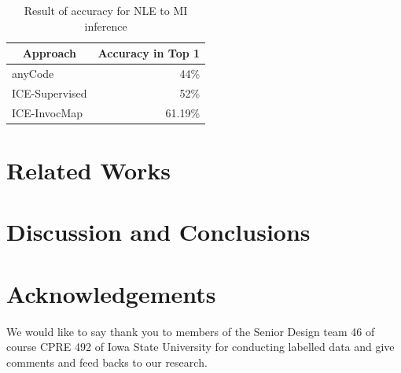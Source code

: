 \documentclass[sigconf,review]{acmart}
\begin{document}
\begin{table}[H]
\small
\caption{Result of accuracy for NLE to MI inference}
\label{tblAccuracy}
\centering
\begin{tabular}{|l|r|}
\hline
\multicolumn{1}{|c|}{\textbf{Approach}} & \multicolumn{1}{c|}{\textbf{Accuracy in Top 1}} \\ \hline
anyCode                                 & 44\%                                            \\ \hline
ICE-Supervised                                & 52\%                                         \\ \hline
ICE-InvocMap                                & 61.19\%                                         \\ \hline
\end{tabular}
\end{table}

\section{Related Works}

\section{Discussion and Conclusions}


\section*{Acknowledgements}
We would like to say thank you to members of the Senior Design team 46 of course CPRE 492 of Iowa State University for conducting labelled data and give comments and feed backs to our research.

\clearpage
{}

\end{document}
